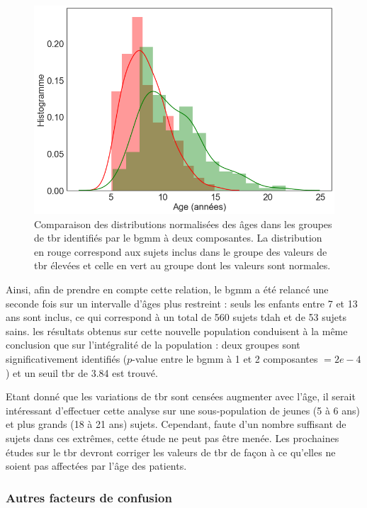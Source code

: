 \begin{figure}[h!]
  \centering
	\includegraphics[width=0.7\linewidth]{figures/chapter-4/tbr-age-distribution} 
  \caption[Comparaison des distributions normalisées des âges dans les groupes de \gls{tbr} identifiés par le \gls{bgmm} à deux composantes.]{Comparaison des distributions 
	normalisées des âges dans les groupes de \gls{tbr} identifiés par le \gls{bgmm} à deux composantes. La distribution
	en rouge correspond aux sujets inclus dans le groupe des valeurs de \gls{tbr} élevées et celle en vert au groupe dont les valeurs sont normales.}
  \label{Figure:tbr_age_distribution}
\end{figure}

Ainsi, afin de prendre en compte cette relation, le \gls{bgmm} a été relancé une seconde fois sur un intervalle d'âges plus restreint : seuls les enfants
entre 7 et 13 ans sont inclus, ce qui correspond à un total de 560 sujets \gls{tdah} et de 53 sujets sains. les résultats obtenus sur cette nouvelle population 
conduisent à la même conclusion que sur l'intégralité de la population : deux groupes sont significativement identifiés ($p$-value entre le \gls{bgmm} à 1 et 2 
composantes $= 2e-4$) et un seuil \gls{tbr} de 3.84 est trouvé. 

Etant donné que les variations de \gls{tbr} sont censées augmenter avec l'âge, il serait intéressant d'effectuer cette analyse sur une sous-population de jeunes (5 
à 6 ans) et plus grands (18 à 21 ans) sujets. Cependant, faute d'un nombre suffisant de sujets dans ces extrêmes, cette étude ne peut pas être menée. Les prochaines
études sur le \gls{tbr} devront corriger les valeurs de \gls{tbr} de façon à ce qu'elles ne soient pas affectées par l'âge des patients.

\subsubsection{Autres facteurs de confusion}

